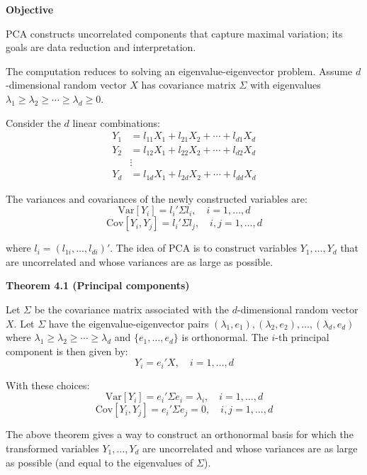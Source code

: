 \documentclass[12pt,a4paper]{article}
\begin{document}
\textbf{Objective}

PCA constructs uncorrelated components that capture maximal variation; its goals are data reduction and interpretation.

The computation reduces to solving an eigenvalue-eigenvector problem. Assume $d$-dimensional random vector $X$ has covariance matrix $\Sigma$ with eigenvalues $\lambda_1 \geq \lambda_2 \geq \cdots \geq \lambda_d \geq 0$.

\vspace{0.5em}

Consider the $d$ linear combinations:
\[
\begin{aligned}
Y_1 &= l_{11}X_1 + l_{21}X_2 + \cdots + l_{d1}X_d \\
Y_2 &= l_{12}X_1 + l_{22}X_2 + \cdots + l_{d2}X_d \\
&\vdots \\
Y_d &= l_{1d}X_1 + l_{2d}X_2 + \cdots + l_{dd}X_d
\end{aligned}
\]

The variances and covariances of the newly constructed variables are:
\[
\text{Var}[Y_i] = l_i'\Sigma l_i, \quad i = 1, \ldots, d
\]
\[
\text{Cov}[Y_i, Y_j] = l_i'\Sigma l_j, \quad i, j = 1, \ldots, d
\]

where $l_i = (l_{1i}, \ldots, l_{di})'$. The idea of PCA is to construct variables $Y_1, \ldots, Y_d$ that are uncorrelated and whose variances are as large as possible.

\vspace{0.5em}

\textbf{Theorem 4.1 (Principal components)}

Let $\Sigma$ be the covariance matrix associated with the $d$-dimensional random vector $X$. Let $\Sigma$ have the eigenvalue-eigenvector pairs $(\lambda_1, e_1), (\lambda_2, e_2), \ldots, (\lambda_d, e_d)$ where $\lambda_1 \geq \lambda_2 \geq \cdots \geq \lambda_d$ and $\{e_1, \ldots, e_d\}$ is orthonormal. The $i$-th principal component is then given by:
\[
Y_i = e_i'X, \quad i = 1, \ldots, d
\]

With these choices:
\[
\text{Var}[Y_i] = e_i'\Sigma e_i = \lambda_i, \quad i = 1, \ldots, d
\]
\[
\text{Cov}[Y_i, Y_j] = e_i'\Sigma e_j = 0, \quad i, j = 1, \ldots, d
\]

The above theorem gives a way to construct an orthonormal basis for which the transformed variables $Y_1, \ldots, Y_d$ are uncorrelated and whose variances are as large as possible (and equal to the eigenvalues of $\Sigma$).
\end{document}
